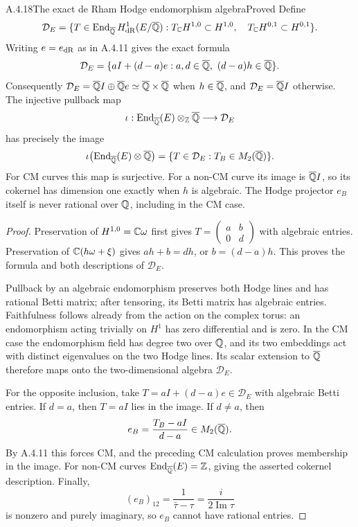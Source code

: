 \begin{result}{A.4.18}{The exact de Rham Hodge endomorphism algebra}{Proved}
Define
\[
 \mathcal D_E=\{T\in\operatorname{End}_{\overline{\mathbb Q}}H^1_{\mathrm{dR}}(E/\overline{\mathbb Q}):
 T_\mathbb C H^{1,0}\subset H^{1,0},\quad T_\mathbb C H^{0,1}\subset H^{0,1}\}.
\]
Writing $e=e_{\mathrm{dR}}$ as in A.4.11 gives the exact formula
\[
 \mathcal D_E
 =\{aI+(d-a)e:a,d\in\overline{\mathbb Q},\ (d-a)h\in\overline{\mathbb Q}\}.
\]
Consequently $\mathcal D_E=\overline{\mathbb Q} I\oplus\overline{\mathbb Q} e\simeq\overline{\mathbb Q}\times\overline{\mathbb Q}$ when $h\in\overline{\mathbb Q}$, and $\mathcal D_E=\overline{\mathbb Q} I$ otherwise. The injective pullback map
\[
 \iota:\operatorname{End}_{\overline{\mathbb Q}}(E)\otimes_{\mathbb Z}\overline{\mathbb Q}
 \longrightarrow\mathcal D_E
\]
has precisely the image
\[
 \iota\bigl(\operatorname{End}_{\overline{\mathbb Q}}(E)\otimes\overline{\mathbb Q}\bigr)
 =\{T\in\mathcal D_E:T_B\in M_2(\overline{\mathbb Q})\}.
\]
For CM curves this map is surjective. For a non-CM curve its image is $\overline{\mathbb Q} I$, so its cokernel has dimension one exactly when $h$ is algebraic. The Hodge projector $e_B$ itself is never rational over $\mathbb Q$, including in the CM case.
\end{result}
\begin{proof}
Preservation of $H^{1,0}=\mathbb C\omega$ first gives
$T=\left(\begin{smallmatrix}a&b\\0&d\end{smallmatrix}\right)$ with algebraic entries. Preservation of $\mathbb C(h\omega+\xi)$ gives $ah+b=dh$, or $b=(d-a)h$. This proves the formula and both descriptions of $\mathcal D_E$.

Pullback by an algebraic endomorphism preserves both Hodge lines and has rational Betti matrix; after tensoring, its Betti matrix has algebraic entries. Faithfulness follows already from the action on the complex torus: an endomorphism acting trivially on $H^1$ has zero differential and is zero. In the CM case the endomorphism field has degree two over $\mathbb Q$, and its two embeddings act with distinct eigenvalues on the two Hodge lines. Its scalar extension to $\overline{\mathbb Q}$ therefore maps onto the two-dimensional algebra $\mathcal D_E$.

For the opposite inclusion, take $T=aI+(d-a)e\in\mathcal D_E$ with algebraic Betti entries. If $d=a$, then $T=aI$ lies in the image. If $d\ne a$, then
\[
 e_B=\frac{T_B-aI}{d-a}\in M_2(\overline{\mathbb Q}).
\]
By A.4.11 this forces CM, and the preceding CM calculation proves membership in the image. For non-CM curves $\operatorname{End}_{\overline{\mathbb Q}}(E)=\mathbb Z$, giving the asserted cokernel description. Finally,
\[
 (e_B)_{12}=\frac1{\bar\tau-\tau}=\frac{i}{2\operatorname{Im}\tau}
\]
is nonzero and purely imaginary, so $e_B$ cannot have rational entries.
\end{proof}

